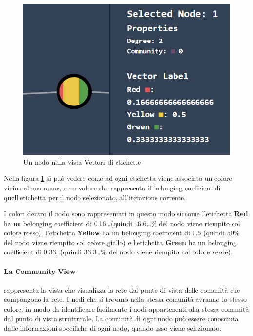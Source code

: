 \documentclass[a4paper,12pt]{report}
\begin{document}
			\begin{center}
			\begin{figure}[H]
			\centering
			\includegraphics[width=0.8\linewidth,keepaspectratio]{vlrep}
			\caption{Un nodo nella vista Vettori di etichette}
			\label{fig:vlrep}
			\end{figure}
			\end{center}

			Nella figura \ref{fig:vlrep} si può vedere come ad ogni etichetta viene associato un colore vicino al suo nome, e un valore che rappresenta il belonging coeffcient di quell'etichetta per il nodo selezionato, all'iterazione corrente. 

			I colori dentro il nodo sono rappresentati in questo modo siccome l'etichetta \textbf{Red} ha un belonging coefficient di 0.16\dots (quindi 16.6\dots\% del nodo viene riempito col colore rosso), l'etichetta \textbf{Yellow} ha un belonging coefficient di 0.5 (quindi 50\% del nodo viene riempito col colore giallo) e l'etichetta \textbf{Green} ha un belonging coefficient di 0.33\dots (quindi 33.3\dots\% del nodo viene riempito col colore verde).

\pagebreak	

		\paragraph*{La Community View} rappresenta la vista che visualizza la rete dal punto di vista delle comunità che compongono la rete. I nodi che si trovano nella stessa comunità avranno lo stesso colore, in modo da identificare facilmente i nodi appartenenti alla stessa comunità dal punto di vista strutturale. La comunità di ogni nodo può essere conosciuta dalle informazioni specifiche di ogni nodo, quando esso viene selezionato. 
\end{document}
